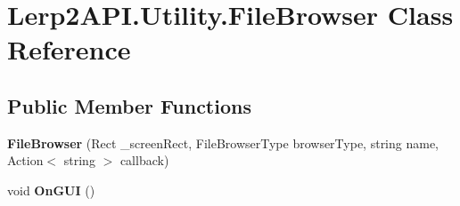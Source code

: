 \hypertarget{class_lerp2_a_p_i_1_1_utility_1_1_file_browser}{}\section{Lerp2\+A\+P\+I.\+Utility.\+File\+Browser Class Reference}
\label{class_lerp2_a_p_i_1_1_utility_1_1_file_browser}
\subsection*{Public Member Functions}
\begin{DoxyCompactItemize}
\item 
\mbox{\label{class_lerp2_a_p_i_1_1_utility_1_1_file_browser_a05a3b77b7e05d43111821ae8524c0260}} 
{\bfseries File\+Browser} (Rect \+\_\+screen\+Rect, File\+Browser\+Type browser\+Type, string name, Action$<$ string $>$ callback)
\item 
\mbox{\label{class_lerp2_a_p_i_1_1_utility_1_1_file_browser_a3c08b2d6e693189b786787086cccf889}} 
void {\bfseries On\+G\+UI} ()
\end{DoxyCompactItemize}
